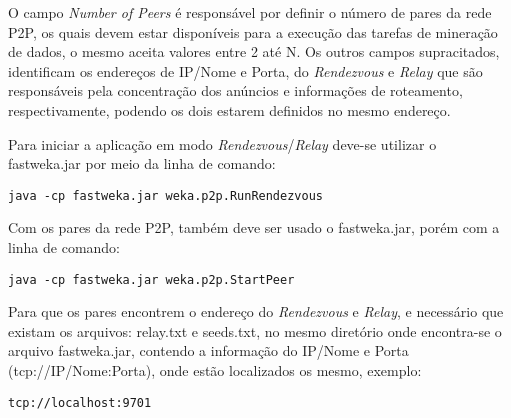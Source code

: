 O campo \textit{Number of Peers} é responsável por definir o número de pares da rede P2P, os quais devem estar disponíveis para a execução das tarefas de mineração de dados, o mesmo aceita valores entre 2 até N.  Os outros campos supracitados, identificam os endereços de IP/Nome e Porta, do \textit{Rendezvous} e \textit{Relay} que são responsáveis pela concentração dos anúncios e informações de roteamento, respectivamente, podendo os dois estarem definidos no mesmo endereço.

Para iniciar a aplicação em modo \textit{Rendezvous}/\textit{Relay} deve-se utilizar o fastweka.jar por meio da linha de comando:
\begin{Verbatim}[frame=single]
java -cp fastweka.jar weka.p2p.RunRendezvous
\end{Verbatim}

Com os pares da rede P2P, também deve ser usado o fastweka.jar, porém com a linha de comando:
\begin{Verbatim}[frame=single]
java -cp fastweka.jar weka.p2p.StartPeer
\end{Verbatim}

Para que os pares encontrem o endereço do \textit{Rendezvous} e \textit{Relay}, e necessário que existam os arquivos: relay.txt e seeds.txt, no mesmo diretório onde encontra-se o arquivo fastweka.jar, contendo a informação do IP/Nome e Porta (tcp://IP/Nome:Porta), onde estão localizados os mesmo, exemplo:
\begin{Verbatim}[frame=single]
tcp://localhost:9701
\end{Verbatim}